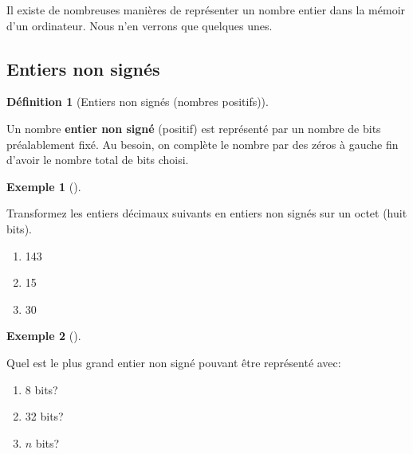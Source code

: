 \documentclass[
  letterpaper,
]{scrbook}
\providecommand{\tightlist}{%
  \setlength{\itemsep}{0pt}\setlength{\parskip}{0pt}}\usepackage{longtable,booktabs,array}
\theoremstyle{plain}
\theoremstyle{definition}
\newtheorem{example}{Exemple}[chapter]
\theoremstyle{definition}
\newtheorem{definition}{Définition}[chapter]
\theoremstyle{remark}
\begin{document}
Il existe de nombreuses manières de représenter un nombre entier dans la
mémoir d'un ordinateur. Nous n'en verrons que quelques unes.

\hypertarget{entiers-non-signuxe9s}{%
\subsection{Entiers non signés}\label{entiers-non-signuxe9s}}

\leavevmode{}%
\begin{definition}[Entiers non signés (nombres
positifs)]\label{def-entiers-non-signes}

Un nombre \textbf{entier non signé} (positif) est représenté par un
nombre de bits préalablement fixé. Au besoin, on complète le nombre par
des zéros à gauche fin d'avoir le nombre total de bits choisi.

\end{definition}

\leavevmode{}%
\begin{example}[]\label{exm-entiers-non-signes}

Transformez les entiers décimaux suivants en entiers non signés sur un
octet (huit bits).

\begin{enumerate}
\def\labelenumi{\alph{enumi})}
\tightlist
\item
  143
\item
  15
\item
  30
\end{enumerate}

\end{example}

\leavevmode{}%
\begin{example}[]\label{exm-plus-grand-entier-non-signe}

Quel est le plus grand entier non signé pouvant être représenté avec:

\begin{enumerate}
\def\labelenumi{\alph{enumi})}
\tightlist
\item
  8 bits?
\item
  32 bits?
\item
  \(n\) bits?
\end{enumerate}

\end{example}
\end{document}
